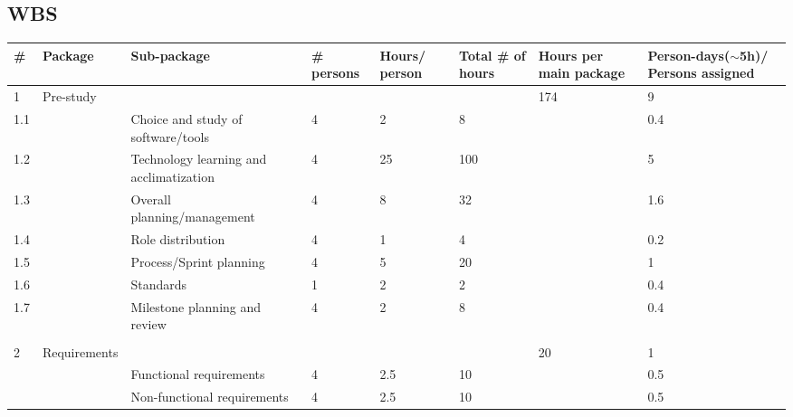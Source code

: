\subsection{WBS}
\setlength\tabcolsep{2pt}
\begin{longtable}{|p{0.7cm}|p{3cm}|p{2cm}|p{2cm}|p{2cm}|p{2cm}|p{2cm}|p{2cm}|}
\hline
\# & Package & Sub-package & \# persons & Hours/ person & Total \# of hours & Hours per main package & Person-days($\sim$5h)/ Persons assigned\\
\hline
1 & Pre-study &  &  &  &  & 174 & 9\\ 
\hline
1.1 &  & Choice and study of software/tools & 4 & 2 & 8 &  & 0.4\\ 
\hline
1.2 &  & Technology learning and acclimatization & 4 & 25 & 100 &  & 5\\ 
\hline
1.3 &  & Overall planning/management & 4 & 8 & 32 &  & 1.6\\ 
\hline
1.4 &  & Role distribution & 4 & 1 & 4 &  & 0.2\\ 
\hline
1.5 &  & Process/Sprint planning & 4 & 5 & 20 &  & 1\\ 
\hline
1.6 &  & Standards & 1 & 2 & 2 &  & 0.4\\ 
\hline
1.7 &  & Milestone planning and review & 4 & 2 & 8 &  & 0.4\\ 
\hline
 &  &  &  &  &  &  & \\ 
\hline
2 & Requirements &  &  &  &  & 20 & 1\\ 
\hline
 &  & Functional requirements & 4 & 2.5 & 10 &  & 0.5\\ 
\hline
 &  & Non-functional requirements & 4 & 2.5 & 10 &  & 0.5\\ 


\end{longtable}

